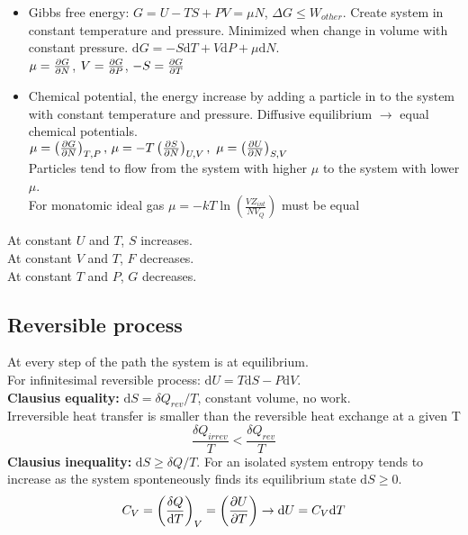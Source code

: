 \documentclass[a4paper, norsk, 8pt]{article}
\begin{document}
\begin{multicols*}{3}
\begin{itemize}
    \item  Gibbs free energy: $G=U-TS+PV = \mu N$, $\Delta G \leq W_{other}$. Create system in constant temperature and pressure. Minimized when change in volume with constant pressure. $\mbox{d}G = -S\mbox{d}T + V\mbox{d}P +\mu \mbox{d}N$. \\ $\mu=\pdv{G}{N}$, $V = \pdv{G}{P}$, $-S=\pdv{G}{T}$
    \item Chemical potential, the energy increase by adding a particle in to the system with constant temperature and pressure. Diffusive equilibrium $\rightarrow$ equal chemical potentials.\\
    $\mu=\left(\pdv{G}{N}\right)_{T,P}, \, \mu=-T\left( \pdv{S}{N} \right)_{U,V}, \,\, \mu=\left( \pdv{U}{N} \right)_{S,V}$\\
    Particles tend to flow from the system with higher $\mu$ to the system with lower $\mu$.\\
    For monatomic ideal gas $\mu = -kT \ln{\left( \frac{VZ_{int}}{NV_Q} \right)}$ must be equal
\end{itemize}
At constant $U$ and $T$, $S$ increases.\\
At constant $V$ and $T$, $F$ decreases.\\
At constant $T$ and $P$, $G$ decreases.\\

\subsection*{\footnotesize  Reversible process}
At every step of the path the system is at equilibrium.\\ For infinitesimal reversible process: $\mbox{d}U = T\mbox{d}S - P \mbox{d}V$.\\
\textbf{Clausius equality:} $\mbox{d}S = \delta Q_{rev}/T$, constant volume, no work.\\
Irreversible	heat	transfer		is	smaller than the reversible	heat
exchange at	a	given	T
$$\frac{\delta Q_{irrev}}{T}  < \frac{\delta Q_{rev}}{T} $$
\textbf{Clausius inequality:} $\mbox{d}S \geq \delta Q/T$. For an isolated system entropy tends to	increase as	the system	sponteneously finds its equilibrium state $\mbox{d}S \geq 0$.
\begin{align*}
  C_V = \left( \frac{\delta Q}{\mbox{d}T} \right)_V = \left( \pdv{U}{T} \right) \rightarrow \mbox{d}U = C_V \mbox{d}T
\end{align*}


\end{multicols*}
\end{document}
